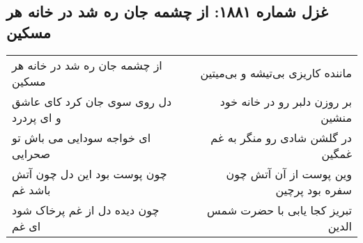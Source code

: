 \begin{center}
\section*{غزل شماره ۱۸۸۱: از چشمه جان ره شد در خانه هر مسکین}
\label{sec:1881}
\begin{longtable}{l p{0.5cm} r}
از چشمه جان ره شد در خانه هر مسکین
&&
ماننده کاریزی بی‌تیشه و بی‌میتین
\\
دل روی سوی جان کرد کای عاشق و ای پردرد
&&
بر روزن دلبر رو در خانه خود منشین
\\
ای خواجه سودایی می باش تو صحرایی
&&
در گلشن شادی رو منگر به غم غمگین
\\
چون پوست بود این دل چون آتش باشد غم
&&
وین پوست از آن آتش چون سفره بود پرچین
\\
چون دیده دل از غم پرخاک شود ای غم
&&
تبریز کجا یابی با حضرت شمس الدین
\\
\end{longtable}
\end{center}
